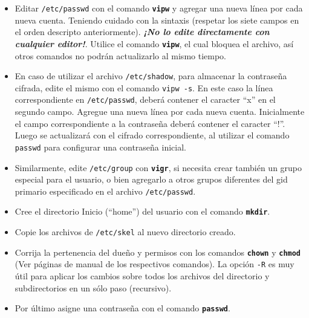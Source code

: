 \documentclass[12pt]{article}
\begin{document}
\begin{itemize}
	
	\item  Editar \texttt{/etc/passwd} con el comando 
	\texttt{\textbf{vipw}} y agregar una nueva línea por cada nueva cuenta.
	Teniendo cuidado con la sintaxis (respetar los siete campos en el orden 
	descripto anteriormente).  \textit{\bf ¡No lo edite directamente
	con cualquier editor!}. Utilice el comando \texttt{\textbf{vipw}}, el cual bloquea el
	archivo, así otros comandos no podrán actualizarlo al mismo tiempo.

	\item En caso de utilizar el archivo \texttt{/etc/shadow}, para almacenar
	la contraseña cifrada, edite el mismo con el comando \texttt{vipw -s}. En este
	caso la línea correspondiente en \texttt{/etc/passwd}, deberá contener el caracter
	``x'' en el segundo campo. Agregue una nueva línea por cada nueva cuenta. Inicialmente
	el campo correspondiente a la contraseña deberá contener el caracter ``!''. Luego 
	se actualizará con el cifrado correspondiente, al utilizar el comando \texttt{passwd} para 
	configurar una contraseña inicial.  

	\item Similarmente, edite \texttt{/etc/group} con
	\texttt{\textbf{vigr}}, si necesita crear también un
	grupo especial para el usuario, o bien agregarlo a otros grupos
	diferentes del gid primario especificado en el archivo \texttt{/etc/passwd}.  
        
	\item Cree el directorio Inicio (``home'') del
	usuario con el comando \texttt{\textbf{mkdir}}.

	\item Copie los archivos de \texttt{/etc/skel} al nuevo directorio creado.

	\item Corrija
	la pertenencia del dueño y permisos con los comandos
	\texttt{\textbf{chown}} y \texttt{\textbf{chmod}} (Ver páginas de
	manual de los respectivos comandos). La opción \texttt{-R} es
	muy útil para aplicar los cambios sobre todos los archivos del directorio
	y subdirectorios en un sólo paso (recursivo). 
 
	\item Por último asigne una contraseña con el comando
	\texttt{\textbf{passwd}}.

\end{itemize} 
\end{document}
